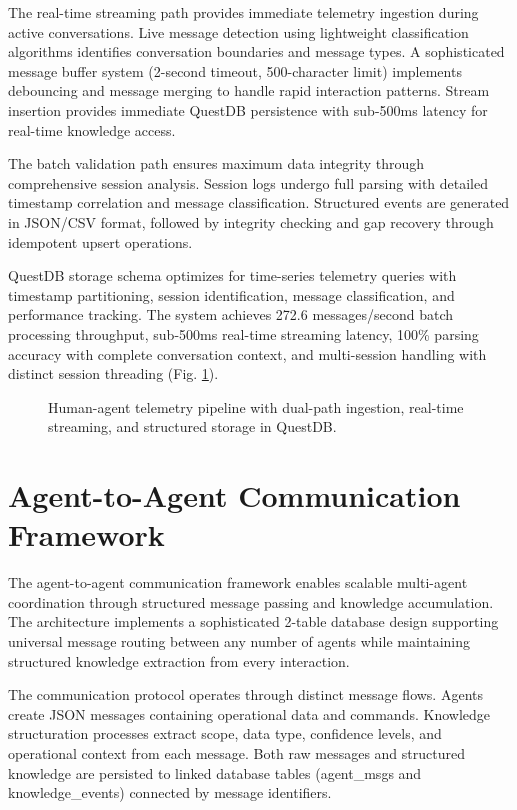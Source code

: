 \documentclass[11pt]{article}
\begin{document}
	The real-time streaming path provides immediate telemetry ingestion during active conversations. Live message detection using lightweight classification algorithms identifies conversation boundaries and message types. A sophisticated message buffer system (2-second timeout, 500-character limit) implements debouncing and message merging to handle rapid interaction patterns. Stream insertion provides immediate QuestDB persistence with sub-500ms latency for real-time knowledge access.
	
	The batch validation path ensures maximum data integrity through comprehensive session analysis. Session logs undergo full parsing with detailed timestamp correlation and message classification. Structured events are generated in JSON/CSV format, followed by integrity checking and gap recovery through idempotent upsert operations.
	
	QuestDB storage schema optimizes for time-series telemetry queries with timestamp partitioning, session identification, message classification, and performance tracking. The system achieves 272.6 messages/second batch processing throughput, sub-500ms real-time streaming latency, 100\% parsing accuracy with complete conversation context, and multi-session handling with distinct session threading (Fig. \ref{fig:human-telemetry}).
	
	\begin{figure}[H]
		\centering
		\scalebox{0.75}{}
		\caption{Human-agent telemetry pipeline with dual-path ingestion, real-time streaming, and structured storage in QuestDB.}
		\label{fig:human-telemetry}
	\end{figure}
	
	\section{Agent-to-Agent Communication Framework}
	\label{sec:agent-communication}
	
	The agent-to-agent communication framework enables scalable multi-agent coordination through structured message passing and knowledge accumulation. The architecture implements a sophisticated 2-table database design supporting universal message routing between any number of agents while maintaining structured knowledge extraction from every interaction.
	
	The communication protocol operates through distinct message flows. Agents create JSON messages containing operational data and commands. Knowledge structuration processes extract scope, data type, confidence levels, and operational context from each message. Both raw messages and structured knowledge are persisted to linked database tables (agent\_msgs and knowledge\_events) connected by message identifiers.
	
\end{document}
